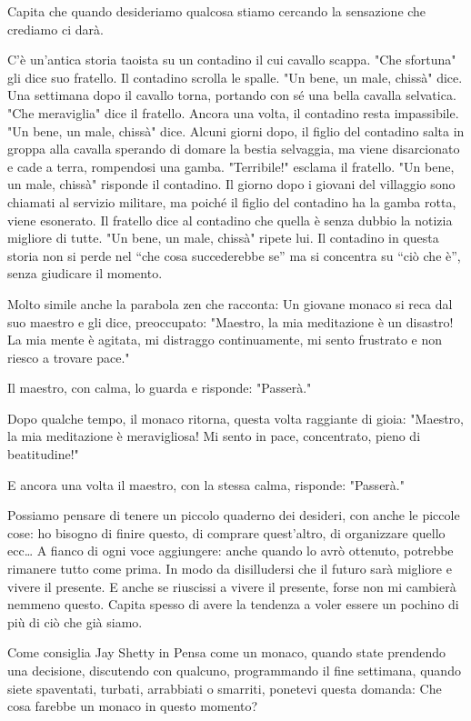 \documentclass[12pt]{book} %
\begin{document}
\begin{mdframed}[linewidth=1pt]
Capita che quando desideriamo qualcosa stiamo cercando la sensazione che crediamo ci darà. 

C'è un'antica storia taoista su un contadino il cui cavallo scappa.
"Che sfortuna" gli dice suo fratello. Il contadino scrolla le spalle.
"Un bene, un male, chissà" dice. Una settimana dopo il cavallo torna,
portando con sé una bella cavalla selvatica. "Che meraviglia" dice il
fratello. Ancora una volta, il contadino resta impassibile. "Un bene, un male,
chissà" dice. Alcuni giorni dopo, il figlio del contadino salta in groppa alla cavalla sperando di
domare la bestia selvaggia, ma viene disarcionato e cade a terra, rompendosi una gamba.
"Terribile!" esclama il fratello. "Un bene, un male,
chissà" risponde il contadino. Il giorno dopo i giovani del villaggio sono chiamati al servizio
militare, ma poiché il figlio del contadino ha la gamba rotta, viene esonerato. Il fratello dice al contadino che
quella è senza dubbio la notizia migliore di tutte. "Un bene, un male,
chissà" ripete lui. Il contadino in questa storia non si perde nel “che cosa succederebbe se” ma
si concentra su “ciò che è”, senza giudicare il momento.

Molto simile anche la parabola zen che racconta:
Un giovane monaco si reca dal suo maestro e gli dice, preoccupato:
"Maestro, la mia meditazione è un disastro! La mia mente è agitata, mi distraggo continuamente, mi sento frustrato e non riesco a trovare pace."

Il maestro, con calma, lo guarda e risponde:
"Passerà."

Dopo qualche tempo, il monaco ritorna, questa volta raggiante di gioia:
"Maestro, la mia meditazione è meravigliosa! Mi sento in pace, concentrato, pieno di beatitudine!"

E ancora una volta il maestro, con la stessa calma, risponde:
"Passerà."


Possiamo pensare di tenere un piccolo quaderno dei desideri, con  anche le piccole cose:
ho bisogno di finire questo, di comprare quest'altro, di organizzare quello ecc…
A fianco di ogni voce aggiungere: anche quando lo avrò ottenuto, potrebbe rimanere tutto come prima.
In modo da disilludersi che il futuro sarà migliore e vivere il presente.
E anche se riuscissi a vivere il presente, forse non mi cambierà nemmeno questo.
Capita spesso di avere la tendenza a voler essere un pochino di più di ciò che già siamo.

Come consiglia Jay Shetty in Pensa come un monaco, quando state prendendo una
decisione, discutendo con qualcuno, programmando il fine settimana, quando siete spaventati, turbati, arrabbiati o
smarriti, ponetevi questa domanda: Che cosa farebbe un monaco in questo momento? 


\end{mdframed}
\end{document}
